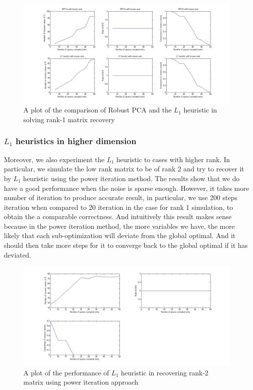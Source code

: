 \begin{figure}[h!]
\label{fig:comparison}
\centering
\includegraphics[width=16cm]{../figures/compare.jpg}
\caption{A plot of the comparison of Robust PCA and the $L_1$ heuristic in solving rank-1 matrix recovery}
\end{figure}

\subsubsection{$L_{1}$ heuristics in higher dimension}
Moreover, we also experiment the $L_1$ heuristic to cases with higher rank. In particular, we simulate the low rank matrix to be of rank 2 and try to recover it by $L_1$ heuristic using the power iteration method. The results show that we do have a good performance when the noise is sparse enough. However, it takes more number of iteration to produce accurate result, in particular, we use 200 steps iteration when compared to 20 iteration in the case for rank 1 simulation, to obtain the a comparable correctness. And intuitively this result makes sense because in the power iteration method, the more variables we have, the more likely that each sub-optimization will deviate from the global optimal. And it should then take more steps for it to converge back to the global optimal if it has deviated.
\begin{figure}[h!]
\label{fig:rank2}
\centering
\includegraphics[width=16cm]{../figures/rank2case.jpg}
\caption{A plot of the performance of $L_1$ heuristic in recovering rank-2 matrix using power iteration approach}
\end{figure}

